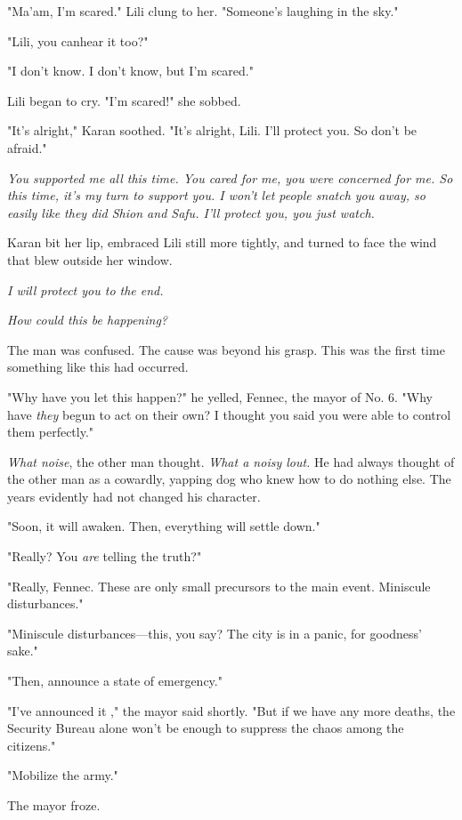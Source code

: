 "Ma'am, I'm scared." Lili clung to her. "Someone's laughing in the sky."

"Lili, you can\el hear it too?"

"I don't know. I don't know, but I'm scared."

Lili began to cry. "I'm scared!" she sobbed.

"It's alright," Karan soothed. "It's alright, Lili. I'll protect you. So
don't be afraid."

\emph{You supported me all this time. You cared for me, you were concerned for
me. So this time, it's my turn to support you. I won't let people snatch
you away, so easily like they did Shion and Safu. I'll protect you, you
just watch.}

Karan bit her lip, embraced Lili still more tightly, and turned to face
the wind that blew outside her window.

\emph{I will protect you to the end.}

\mybreak

\emph{How could this be happening?}

The man was confused. The cause was beyond his grasp. This was the first
time something like this had occurred.

"Why have you let this happen?" he yelled, Fennec, the mayor of No. 6.
"Why have \emph{they} begun to act on their own? I thought you said you were
able to control them perfectly."

\emph{What noise}, the other man thought. \emph{What a noisy lout.} He had always
thought of the other man as a cowardly, yapping dog who knew how to do
nothing else. The years evidently had not changed his character.

"Soon, it will awaken. Then, everything will settle down."

"Really? You \emph{are} telling the truth?"

"Really, Fennec. These are only small precursors to the main event.
Miniscule disturbances."

"Miniscule disturbances---this, you say? The city is in a panic, for
goodness' sake."

"Then, announce a state of emergency."

"I've announced it ," the mayor said shortly. "But if we have any more
deaths, the Security Bureau alone won't be enough to suppress the chaos
among the citizens."

"Mobilize the army."

The mayor froze.

